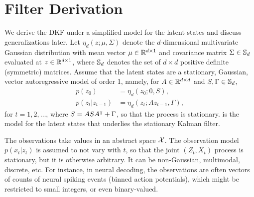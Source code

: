 
\section{Filter Derivation} \label{s:dkf} 

We derive the DKF under a simplified model for the latent states and discuss generalizations later. Let $\eta_d(z;\mu,\Sigma)$ denote the $d$-dimensional multivariate Gaussian distribution with mean vector $\mu\in\RR^{d\times 1}$ and covariance matrix $\Sigma\in\SS_d$ evaluated at $z\in\RR^{d\times 1}$, where $\SS_d$ denotes the set of $d\!\times\!d$ positive definite (symmetric) matrices.
Assume that the latent states are a stationary, Gaussian, vector autoregressive model of order 1, namely, for $A\in\RR^{d\times d}$ and $S,\Gamma\in\SS_d$,   
\begin{subequations} \label{e:s2:Zmodel}
\begin{align}
 p(z_0) & = \eta_d(z_0;0,S), \label{e:s2:Z} \\ 
 p(z_t|z_{t-1}) & = \eta_d(z_t;Az_{t-1},\Gamma), 
\end{align}
\end{subequations}
for $t=1,2,\dotsc$, where $S=ASA^\tr+\Gamma$, so that the process is stationary.  is the model for the latent states that underlies the stationary Kalman filter. 

The observations take values in an abstract space ${\cal{X}}$. The observation model $p(x_t|z_t)$ is assumed to not vary with $t$, so that the joint $(Z_t,X_t)$ process is stationary, but it is otherwise arbitrary. It can be non-Gaussian, multimodal, discrete, etc. For instance, in neural decoding, the observations are often vectors of counts of neural spiking events (binned action potentials), which might be restricted to small integers, or even binary-valued. 

